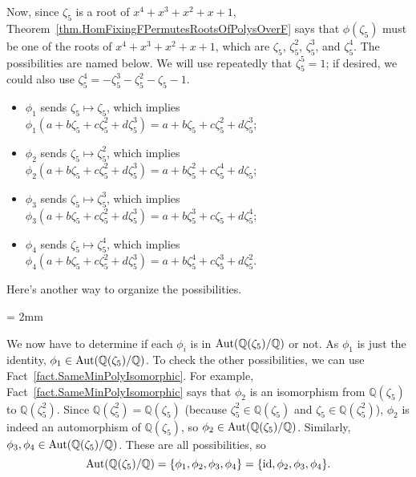 \begin{example}
Now, since $\zeta_5$ is a root of $x^4+x^3+x^2+x+1$,  Theorem~\ref{thm.HomFixingFPermutesRootsOfPolysOverF} says that $\phi(\zeta_5)$ must be one of the roots of $x^4+x^3+x^2+x+1$, which are $\zeta_5$, $\zeta_5^2$, $\zeta_5^3$, and $\zeta_5^4$. The possibilities are named below. We will use repeatedly that $\zeta_5^5 = 1$;  if desired, we could also use $\zeta_5^4 = -\zeta_5^3-\zeta_5^2-\zeta_5-1$.
\begin{itemize}
\item $\phi_1$ sends $\zeta_5\mapsto \zeta_5$, which implies  $\phi_1(a+b\zeta_5+c\zeta_5^2+d\zeta_5^3) = a+b\zeta_5+c\zeta_5^2+d\zeta_5^3$;
\item $\phi_2$ sends $\zeta_5\mapsto \zeta_5^2$, which implies  $\phi_2(a+b\zeta_5+c\zeta_5^2+d\zeta_5^3) = a+b\zeta_5^2+c\zeta_5^4+d\zeta_5$;
\item $\phi_3$ sends $\zeta_5\mapsto \zeta_5^3$, which implies  $\phi_3(a+b\zeta_5+c\zeta_5^2+d\zeta_5^3) = a+b\zeta_5^3+c\zeta_5+d\zeta_5^4$;
\item $\phi_4$ sends $\zeta_5\mapsto \zeta_5^4$, which implies  $\phi_4(a+b\zeta_5+c\zeta_5^2+d\zeta_5^3) = a+b\zeta_5^4+c\zeta_5^3+d\zeta_5^2$.
\end{itemize}
Here's another way to organize the possibilities.
\begin{center}
\tabulinesep = 2mm
\end{center}
We now have to determine if each $\phi_i$ is in $\operatorname{Aut}(\mathbb{Q}(\zeta_5)/\mathbb{Q})$ or not. As $\phi_1$ is just the identity, $\phi_1 \in \operatorname{Aut}(\mathbb{Q}(\zeta_5)/\mathbb{Q})$. To check the other possibilities, we can use Fact~\ref{fact.SameMinPolyIsomorphic}. For example, Fact~\ref{fact.SameMinPolyIsomorphic} says that $\phi_2$ is an isomorphism from $\mathbb{Q}(\zeta_5)$ to $\mathbb{Q}(\zeta_5^2)$. Since $\mathbb{Q}(\zeta_5^2) =\mathbb{Q}(\zeta_5)$ (because $\zeta_5^2\in \mathbb{Q}(\zeta_5)$ and $\zeta_5\in \mathbb{Q}(\zeta_5^2)$), $\phi_2$ is indeed an automorphism of $\mathbb{Q}(\zeta_5)$, so $\phi_2 \in \operatorname{Aut}(\mathbb{Q}(\zeta_5)/\mathbb{Q})$. Similarly, $\phi_3,\phi_4 \in \operatorname{Aut}(\mathbb{Q}(\zeta_5)/\mathbb{Q})$. These are all possibilities, so 
\[\operatorname{Aut}(\mathbb{Q}(\zeta_5)/\mathbb{Q}) = \{\phi_1,\phi_2,\phi_3,\phi_4\} = \{\text{id},\phi_2,\phi_3,\phi_4\}.\]
\end{example}

